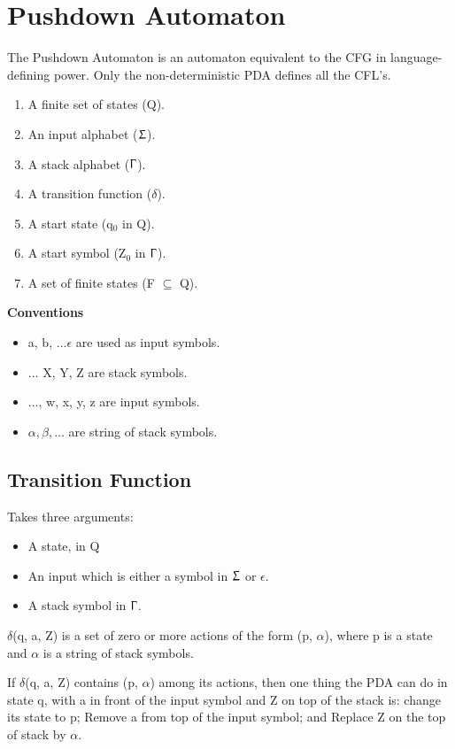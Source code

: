 \documentclass{report}
\begin{document}
\chapter{Pushdown Automaton}
The Pushdown Automaton is an automaton equivalent to the CFG in language-defining power. Only the non-deterministic PDA defines all the CFL’s.
\begin{enumerate}
    \item A finite set of states (Q).
    \item An input alphabet ($\Upsigma$).
    \item A stack alphabet ($\Upgamma$).
    \item A transition function ($\delta$).
    \item A start state (q$_0$ in Q).
    \item A start symbol (Z$_0$ in $\Upgamma$).
    \item A set of finite states (F $\subseteq$ Q).
\end{enumerate}
\textbf{Conventions}
\begin{itemize}
    \item a, b, $\ldots \epsilon$ are used as input symbols.
    \item $\ldots$ X, Y, Z are stack symbols.
    \item $\ldots$, w, x, y, z are input symbols.
    \item $\alpha, \beta, \ldots$ are string of stack symbols.
\end{itemize}
\section{Transition Function}
Takes three arguments: 
\begin{itemize}
    \item A state, in Q
    \item An input which is either a symbol in $\Upsigma$ or $\epsilon$.
    \item A stack symbol in $\Upgamma$.
\end{itemize}
$\delta$(q, a, Z) is a set of zero or more actions of the form (p, $\alpha$), where p is a state and $\alpha$ is a string of stack symbols. \par
If $\delta$(q, a, Z) contains (p, $\alpha$) among its actions, then one thing the PDA can do in state q, with a in front of the input symbol and Z on top of the stack is: change its state to p; Remove a from top of the input symbol; and Replace Z on the top of stack by $\alpha$.
\end{document}
